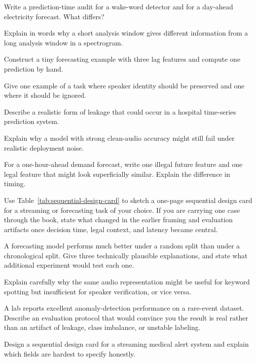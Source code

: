 \begin{exercises}
\item Write a prediction-time audit for a wake-word detector and for a day-ahead electricity forecast. What differs?
\item Explain in words why a short analysis window gives different information from a long analysis window in a spectrogram.
\item Construct a tiny forecasting example with three lag features and compute one prediction by hand.
\item Give one example of a task where speaker identity should be preserved and one where it should be ignored.
\item Describe a realistic form of leakage that could occur in a hospital time-series prediction system.
\item Explain why a model with strong clean-audio accuracy might still fail under realistic deployment noise.
\item For a one-hour-ahead demand forecast, write one illegal future feature and one legal feature that might look superficially similar. Explain the difference in timing.
\item Use Table~\ref{tab:sequential-design-card} to sketch a one-page sequential design card for a streaming or forecasting task of your choice. If you are carrying one case through the book, state what changed in the earlier framing and evaluation artifacts once decision time, legal context, and latency became central.
\end{exercises}

\begin{challengeexercises}
\item A forecasting model performs much better under a random split than under a chronological split. Give three technically plausible explanations, and state what additional experiment would test each one.
\item Explain carefully why the same audio representation might be useful for keyword spotting but insufficient for speaker verification, or vice versa.
\item A lab reports excellent anomaly-detection performance on a rare-event dataset. Describe an evaluation protocol that would convince you the result is real rather than an artifact of leakage, class imbalance, or unstable labeling.
\item Design a sequential design card for a streaming medical alert system and explain which fields are hardest to specify honestly.
\end{challengeexercises}
